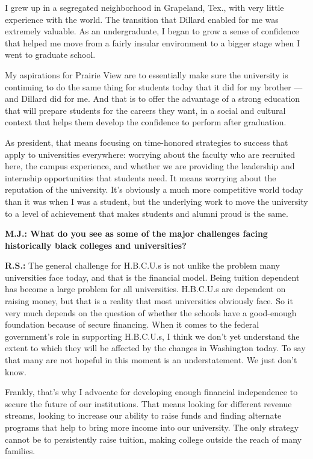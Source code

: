 I grew up in a segregated neighborhood in Grapeland, Tex., with very
little experience with the world. The transition that Dillard enabled
for me was extremely valuable. As an undergraduate, I began to grow a
sense of confidence that helped me move from a fairly insular
environment to a bigger stage when I went to graduate school.

My aspirations for Prairie View are to essentially make sure the
university is continuing to do the same thing for students today that it
did for my brother --- and Dillard did for me. And that is to offer the
advantage of a strong education that will prepare students for the
careers they want, in a social and cultural context that helps them
develop the confidence to perform after graduation.

As president, that means focusing on time-honored strategies to success
that apply to universities everywhere: worrying about the faculty who
are recruited here, the campus experience, and whether we are providing
the leadership and internship opportunities that students need. It means
worrying about the reputation of the university. It's obviously a much
more competitive world today than it was when I was a student, but the
underlying work to move the university to a level of achievement that
makes students and alumni proud is the same.

\textbf{M.J.: What do you see as some of the major challenges facing
historically black colleges and universities?}

\textbf{R.S.:} The general challenge for H.B.C.U.s is not unlike the
problem many universities face today, and that is the financial model.
Being tuition dependent has become a large problem for all universities.
H.B.C.U.s are dependent on raising money, but that is a reality that
most universities obviously face. So it very much depends on the
question of whether the schools have a good-enough foundation because of
secure financing. When it comes to the federal government's role in
supporting H.B.C.U.s, I think we don't yet understand the extent to
which they will be affected by the changes in Washington today. To say
that many are not hopeful in this moment is an understatement. We just
don't know.

Frankly, that's why I advocate for developing enough financial
independence to secure the future of our institutions. That means
looking for different revenue streams, looking to increase our ability
to raise funds and finding alternate programs that help to bring more
income into our university. The only strategy cannot be to persistently
raise tuition, making college outside the reach of many families.

